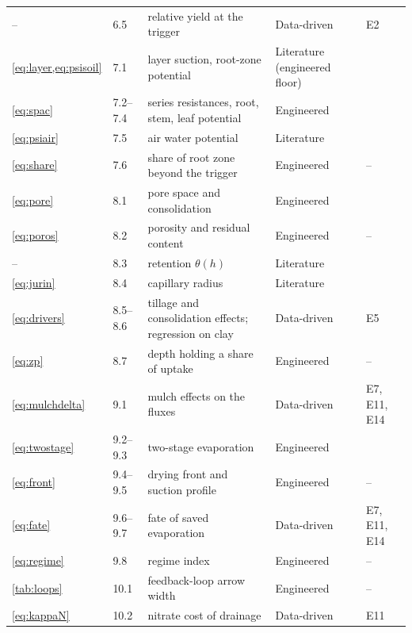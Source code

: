 \begin{longtable}{p{1.7cm}p{1.6cm}p{4.9cm}p{2.2cm}p{3.4cm}}
-- & 6.5 & relative yield at the trigger & Data-driven & E2\\
\cref{eq:layer,eq:psisoil} & 7.1 & layer suction, root-zone potential & Literature (engineered floor) & \citet{vanGenuchten1980}\\
\cref{eq:spac} & 7.2--7.4 & series resistances, root, stem, leaf potential & Engineered & \citet{vandenHonert1948}\\
\cref{eq:psiair} & 7.5 & air water potential & Literature & \citet{Nobel2009}\\
\cref{eq:share} & 7.6 & share of root zone beyond the trigger & Engineered & --\\
\cref{eq:pore} & 8.1 & pore space and consolidation & Engineered & \citet{Flanagan1995}\\
\cref{eq:poros} & 8.2 & porosity and residual content & Engineered & --\\
-- & 8.3 & retention $\theta(h)$ & Literature & \citet{vanGenuchten1980}\\
\cref{eq:jurin} & 8.4 & capillary radius & Literature & \citet{Hillel1998}\\
\cref{eq:drivers} & 8.5--8.6 & tillage and consolidation effects; regression on clay & Data-driven & E5\\
\cref{eq:zp} & 8.7 & depth holding a share of uptake & Engineered & --\\
\cref{eq:mulchdelta} & 9.1 & mulch effects on the fluxes & Data-driven & E7, E11, E14\\
\cref{eq:twostage} & 9.2--9.3 & two-stage evaporation & Engineered & \citet{Ritchie1972,Philip1957}\\
\cref{eq:front} & 9.4--9.5 & drying front and suction profile & Engineered & --\\
\cref{eq:fate} & 9.6--9.7 & fate of saved evaporation & Data-driven & E7, E11, E14\\
\cref{eq:regime} & 9.8 & regime index & Engineered & --\\
\cref{tab:loops} & 10.1 & feedback-loop arrow width & Engineered & --\\
\cref{eq:kappaN} & 10.2 & nitrate cost of drainage & Data-driven & E11\\\bottomrule
\end{longtable}

